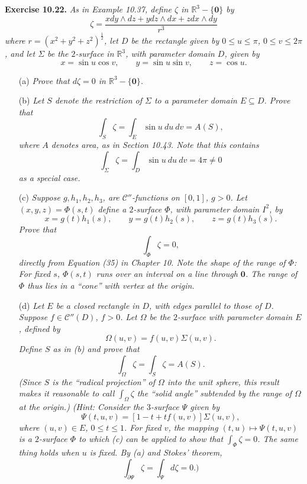 \documentclass{article}
\begin{document}
\textbf{Exercise 10.22.}
\emph{As in Example 10.37, define $\zeta$ in $\mathbb{R}^3-\{\mathbf{0}\}$ by
\[
  \zeta = \frac{x dy \wedge dz + y dz \wedge dx + z dx \wedge dy}{r^3}
\]
where $r = (x^2+y^2+z^2)^{\frac{1}{2}}$,
let $D$ be the rectangle given by $0 \leq u \leq \pi$, $0 \leq v \leq 2\pi$,
and let $\Sigma$ be the $2$-surface in $\mathbb{R}^3$,
with parameter domain $D$, given by
\[
  x = \sin u \cos v,
  \qquad
  y = \sin u \sin v,
  \qquad
  z = \cos u.
\]}
\begin{enumerate}
\item[(a)]
  \emph{Prove that $d\zeta = 0$ in $\mathbb{R}^3 - \{ \mathbf{0} \}$.}

\item[(b)]
  \emph{Let $S$ denote the restriction of $\Sigma$ to a parameter domain $E \subseteq D$.
  Prove that
  \[
    \int_{S} \zeta
    = \int_{E} \sin u \: du \: dv
    = A(S),
  \]
  where $A$ denotes area, as in Section 10.43.
  Note that this contains
  \[
    \int_{\Sigma} \zeta
    = \int_{D} \sin u \: du \: dv
    = 4\pi \neq 0
  \]
  as a special case.}

\item[(c)]
  \emph{Suppose $g, h_1, h_2, h_3$, are $\mathscr{C}''$-functions on $[0,1]$, $g > 0$.
  Let $(x,y,z) = \Phi(s,t)$ define a $2$-surface $\Phi$,
  with parameter domain $I^2$, by
  \[
    x = g(t)h_1(s),
    \qquad
    y = g(t)h_2(s),
    \qquad
    z = g(t)h_3(s).
  \]
  Prove that
  \[
    \int_{\Phi} \zeta = 0,
  \]
  directly from Equation (35) in Chapter 10.
  Note the shape of the range of $\Phi$:
  For fixed $s$, $\Phi(s,t)$ runs over an interval on a line through $\mathbf{0}$.
  The range of $\Phi$ thus lies in a ``cone'' with vertex at the origin.}

\item[(d)]
  \emph{Let $E$ be a closed rectangle in $D$, with edges parallel to those of $D$.
  Suppose $f \in \mathscr{C}''(D)$, $f > 0$.
  Let $\Omega$ be the $2$-surface with parameter domain $E$,
  defined by
  \[
    \Omega(u,v) = f(u,v)\Sigma(u,v).
  \]
  Define $S$ as in (b) and prove that
  \[
    \int_{\Omega} \zeta = \int_{S} \zeta = A(S).
  \]
  (Since $S$ is the ``radical projection'' of $\Omega$ into the unit sphere,
  this result makes it reasonable to call $\int_{\Omega} \zeta$ the ``solid angle''
  subtended by the range of $\Omega$ at the origin.)
  (Hint:
  Consider the $3$-surface $\Psi$ given by
  \[
    \Psi(t,u,v) = [1-t+tf(u,v)]\Sigma(u,v),
  \]
  where $(u,v) \in E$, $0 \leq t \leq 1$.
  For fixed $v$, the mapping $(t,u) \mapsto \Psi(t,u,v)$ is a $2$-surface $\Phi$
  to which (c) can be applied to show that $\int_{\Phi} \zeta = 0$.
  The same thing holds when $u$ is fixed.
  By (a) and Stokes' theorem,
  \[
    \int_{\partial \Psi} \zeta = \int_{\Psi} d\zeta = 0.)
  \]}


\end{enumerate}
\end{document}
